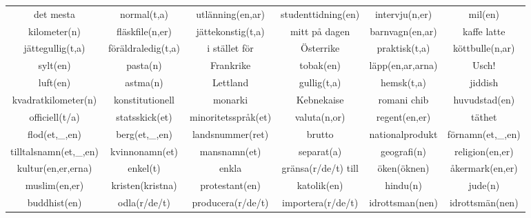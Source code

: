\begin{center}
\begin{adjustwidth}{-2.7cm}{}
\begin{tabular}{|c c c c c c|}
            det mesta & normal(t,a) & utlänning(en,ar) & studenttidning(en) & intervju(n,er) & mil(en) \\
            kilometer(n) & fläskfile(n,er) & jättekonstig(t,a) & mitt på dagen & barnvagn(en,ar) & kaffe latte \\
            jättegullig(t,a) & föräldraledig(t,a) & i stället för & Österrike & praktisk(t,a) & köttbulle(n,ar) \\
            sylt(en) & pasta(n) & Frankrike & tobak(en) & läpp(en,ar,arna) & Usch! \\
            luft(en) & astma(n) & Lettland & gullig(t,a) & hemsk(t,a) & jiddish \\
            kvadratkilometer(n) & konstitutionell & monarki & Kebnekaise & romani chib & huvudstad(en) \\
            officiell(t/a) & statsskick(et) & minoritetsspråk(et) & valuta(n,or) & regent(en,er) & täthet \\
            flod(et,\_,en) & berg(et,\_,en) & landsnummer(ret) & brutto & nationalprodukt & förnamn(et,\_,en) \\
            tilltalsnamn(et,\_,en) & kvinnonamn(et) & mansnamn(et) & separat(a) & geografi(n) & religion(en,er) \\
            kultur(en,er,erna) & enkel(t) & enkla & gränsa(r/de/t) till & öken(öknen) & åkermark(en,er) \\
            muslim(en,er) & kristen(kristna) & protestant(en) & katolik(en) & hindu(n) & jude(n) \\
            buddhist(en) & odla(r/de/t) & producera(r/de/t) & importera(r/de/t) & idrottsman(nen) & idrottsmän(nen) \\
            \hline
        \end{tabular}
    \end{adjustwidth}
\end{center}

